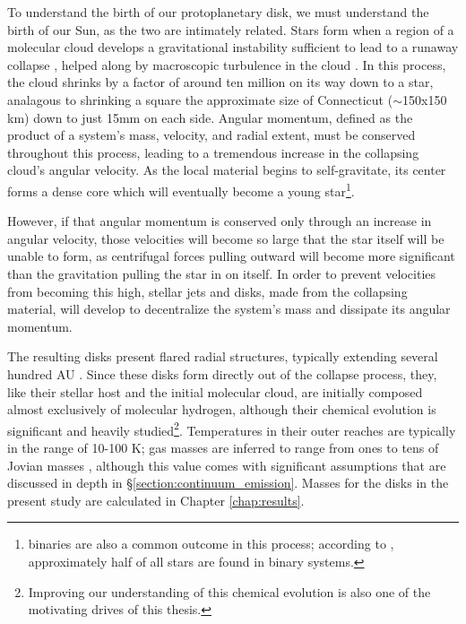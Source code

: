 To understand the birth of our protoplanetary disk, we must understand the birth of our Sun, as the two are intimately related. Stars form when a region of a molecular cloud develops a gravitational instability sufficient to lead to a runaway collapse \citep{Shu1987}, helped along by macroscopic turbulence in the cloud \citep{MckeeOstriker2007}. In this process, the cloud shrinks by a factor of around ten million on its way down to a star, analagous to shrinking a square the approximate size of Connecticut ($\sim$150x150 km) down to just 15mm on each side. Angular momentum, defined as the product of a system's mass, velocity, and radial extent, must be conserved throughout this process,  leading to a tremendous increase in the collapsing cloud's angular velocity. As the local material begins to self-gravitate, its center forms a dense core which will eventually become a young star\footnote{binaries are also a common outcome in this process; according to \citet{DucheneKraus2013}, approximately half of all stars are found in binary systems.}.

However, if that angular momentum is conserved only through an increase in angular velocity, those velocities will become so large that the star itself will be unable to form, as centrifugal forces pulling outward will become more significant than the gravitation pulling the star in on itself. In order to prevent velocities from becoming this high, stellar jets and disks, made from the collapsing material, will develop to decentralize the system's mass and dissipate its angular momentum.

The resulting disks present flared radial structures, typically extending several hundred AU \citep{VicenteAlves2005}. Since these disks form directly out of the collapse process, they, like their stellar host and the initial molecular cloud, are initially composed almost exclusively of molecular hydrogen, although their chemical evolution is significant and heavily studied\footnote{Improving our understanding of this chemical evolution is also one of the motivating drives of this thesis.}. Temperatures in their outer reaches are typically in the range of 10-100 K; gas masses are inferred to range from ones to tens of Jovian masses \citep{AndrewsWilliams2005}, although this value comes with significant assumptions that are discussed in depth in \S\ref{section:continuum_emission}. Masses for the disks in the present study are calculated in Chapter \ref{chap:results}.


